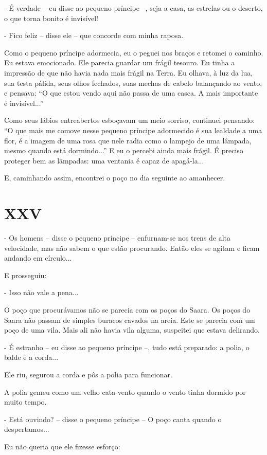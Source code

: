 - É verdade -- eu disse ao pequeno príncipe --, seja a casa, as estrelas
ou o deserto, o que torna bonito é invisível!

- Fico feliz -- disse ele -- que concorde com minha raposa.

Como o pequeno príncipe adormecia, eu o peguei nos braços e retomei o
caminho. Eu estava emocionado. Ele parecia guardar um frágil tesouro. Eu
tinha a impressão de que não havia nada mais frágil na Terra. Eu olhava,
à luz da lua, sua testa pálida, seus olhos fechados, suas mechas de
cabelo balançando ao vento, e pensava: ``O que estou vendo aqui não
passa de uma casca. A mais importante é invisível...''

Como seus lábios entreabertos esboçavam um meio sorriso, continuei
pensando: ``O que mais me comove nesse pequeno príncipe adormecido é sua
lealdade a uma flor, é a imagem de uma rosa que nele radia como o
lampejo de uma lâmpada, mesmo quando está dormindo...'' E eu o percebi
ainda mais frágil. É preciso proteger bem as lâmpadas: uma ventania é
capaz de apagá-la...

E, caminhando assim, encontrei o poço no dia seguinte ao amanhecer.

\chapter{XXV}

- Os homens -- disse o pequeno príncipe -- enfurnam-se nos trens de alta
velocidade, mas não sabem o que estão procurando. Então eles se agitam e
ficam andando em círculo...

E prosseguiu:

- Isso não vale a pena...

O poço que procurávamos não se parecia com os poços do Saara. Os poços
do Saara não passam de simples buracos cavados na areia. Este se parecia
com um poço de uma vila. Mais ali não havia vila alguma, suspeitei que
estava delirando.

- É estranho -- eu disse ao pequeno príncipe --, tudo está preparado: a
polia, o balde e a corda...

Ele riu, segurou a corda e pôs a polia para funcionar.

A polia gemeu como um velho cata-vento quando o vento tinha dormido por
muito tempo.

- Está ouvindo? -- disse o pequeno príncipe -- O poço canta quando o
despertamos...

Eu não queria que ele fizesse esforço:

